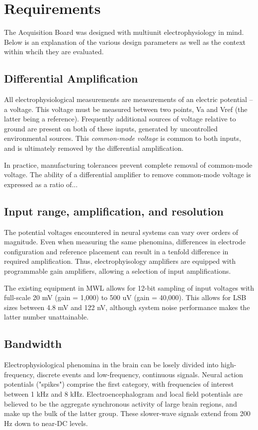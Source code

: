 
\section{Requirements}
The Acquisition Board was designed with multiunit electrophysiology in
mind. Below is an explanation of the various design parameters as well
as the context within whcih they are evaluated.

\subsection{Differential Amplification}
All electrophysiological measurements are measurements of an electric
potential -- a voltage. This voltage must be measured between two
points, Va and Vref (the latter being a reference). Frequently
additional sources of voltage relative to ground are present on both
of these inputs, generated by uncontrolled environmental sources. This
\textit{common-mode voltage} is common to both inputs, and is ultimately
removed by the differential amplification.

 
In practice, manufacturing tolerances prevent complete removal of
common-mode voltage. The ability of a differential amplifier to remove
common-mode voltage is expressed as a ratio of...


\subsection{Input range, amplification, and resolution}

The potential voltages encountered in neural systems can
vary over orders of magnitude. Even when measuring the same
phenomina, differences in electrode configuration and reference
placement can result in a tenfold difference in required
amplification. Thus, electrophyisology amplifiers are equipped
with programmable gain amplifiers, allowing a selection of input
amplifications. 

The existing equipment in MWL allows for 12-bit sampling
of input voltages with full-scale 20 mV (gain = 1,000) to 500 uV
(gain = 40,000). This allows for LSB sizes between 4.8 mV and
122 nV, although system noise performance makes the latter
number unattainable.  

\subsection{Bandwidth}

Electrophysiological phenomina in the brain can be losely divided into
high-frequency, discrete events and low-frequency, continuous signals.
Neural action potentials ("spikes") comprise the first category, with
frequencies of interest between 1 kHz and 8 kHz. Electroencephalogram
and local field potentials are believed to be the aggregate
synchronous activity of large brain regions, and make up the bulk of
the latter group. These slower-wave signals extend from 200 Hz down to
near-DC levels.


